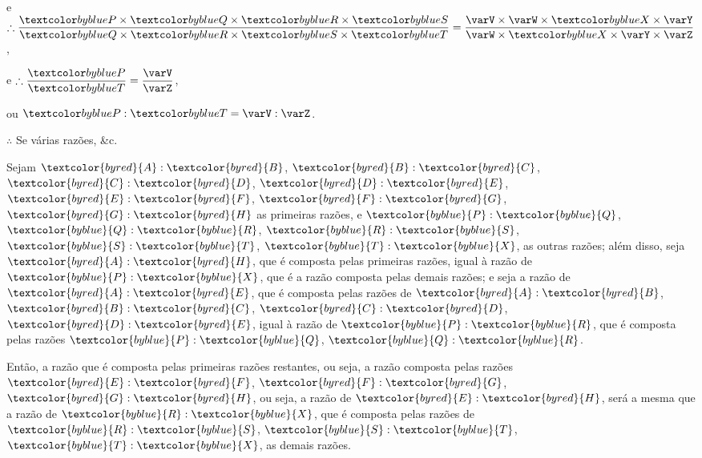 \documentclass[booklanguage=brazilian]{byrnebook}
\begin{document}
\begin{center}
e $\therefore
\dfrac{\varP \times \varQ \times \varR \times \varS}
	{\varQ \times \varR \times \varS \times \varT} =
\dfrac{\varV \times \varW \times \varX \times \varY}
	{\varW \times \varX \times \varY \times \varZ}$,

e $\therefore \dfrac{\varP}{\varT} = \dfrac{\varV}{\varZ}$,

ou $\varP : \varT = \varV : \varZ$.

$\therefore$ Se várias razões, \&c.
\end{center}
\vfill\pagebreak

\label{prop:V.H} %
\def\varA{\textcolor{byred}{A}}
\def\varB{\textcolor{byred}{B}}
\def\varC{\textcolor{byred}{C}}
\def\varD{\textcolor{byred}{D}}
\def\varE{\textcolor{byred}{E}}
\def\varF{\textcolor{byred}{F}}
\def\varG{\textcolor{byred}{G}}
\def\varH{\textcolor{byred}{H}}
\def\varP{\textcolor{byblue}{P}}
\def\varQ{\textcolor{byblue}{Q}}
\def\varR{\textcolor{byblue}{R}}
\def\varS{\textcolor{byblue}{S}}
\def\varT{\textcolor{byblue}{T}}
\def\varX{\textcolor{byblue}{X}}

\marginpar{
~\hfill\fbox{\parbox{0.5\marginparwidth}{\centering
~$\varA\ \varB\ \varC\ \varD\ \varE\ \varF\ \varG\ \varH$~\\
~$\varP\ \varQ\ \varR\ \varS\ \varT\ \varX$~\\
}}\hfill~}
Sejam $\varA : \varB$, $\varB : \varC$, $\varC : \varD$, $\varD : \varE$, $\varE : \varF$, $\varF : \varG$, $\varG : \varH$ as primeiras razões, e $\varP : \varQ$, $\varQ : \varR$, $\varR : \varS$, $\varS : \varT$, $\varT : \varX$, as outras razões; além disso, seja $\varA : \varH$, que é composta pelas primeiras razões, igual à razão de $\varP : \varX$, que é a razão composta pelas demais razões; e seja a razão de $\varA : \varE$, que é composta pelas razões de $\varA : \varB$, $\varB : \varC$, $\varC : \varD$, $\varD : \varE$, igual à razão de $\varP : \varR$, que é composta pelas razões $\varP : \varQ$, $\varQ : \varR$.

Então, a razão que é composta pelas primeiras razões restantes, ou seja, a razão composta pelas razões $\varE : \varF$, $\varF : \varG$, $\varG : \varH$, ou seja, a razão de $\varE : \varH$, será a mesma que a razão de $\varR : \varX$, que é composta pelas razões de $\varR : \varS$, $\varS : \varT$, $\varT : \varX$, as demais razões.
\end{document}

